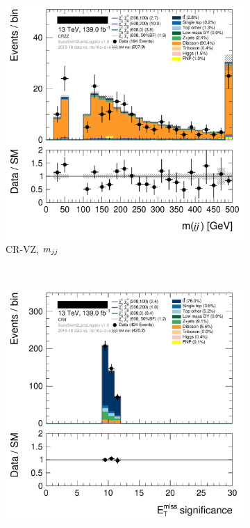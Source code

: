 \begin{figure}[tp]
\begin{subfigure}{0.48\textwidth}
\includegraphics[width=\textwidth]{figures/2ljets_def_mjj_CRZZ.png}
\caption{CR-VZ, $m_{jj}$}
\end{subfigure}
\\[0.5em]
\begin{subfigure}{0.48\textwidth}
\centering
\includegraphics[width=\textwidth]{figures/2ljets_def_met_Sign_CRtt.png}

\end{subfigure}
\end{figure}
